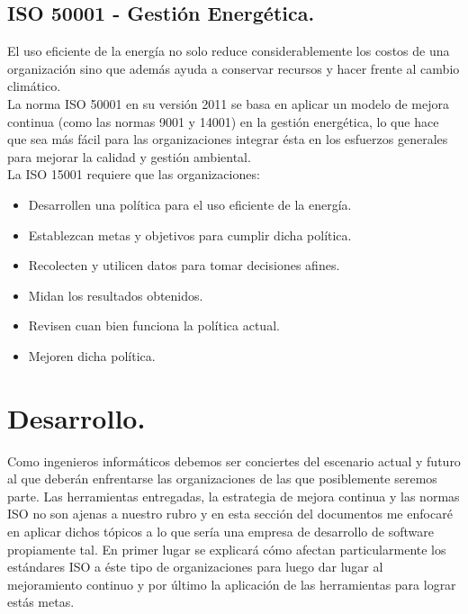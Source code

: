 \documentclass[spanish, fleqn]{article}
\begin{document}
	\subsection{ISO 50001 - Gestión Energética.}
	El uso eficiente de la energía no solo reduce considerablemente los costos
	de una organización sino que además ayuda a conservar recursos y hacer 
	frente al cambio climático.\\
	La norma ISO 50001 en su versión 2011\cite{iso501} se basa en aplicar un 
	modelo de mejora continua (como las normas 9001 y 14001) en la gestión 
	energética, lo que hace que sea más fácil para las organizaciones integrar
	ésta en los esfuerzos generales para mejorar la calidad y gestión ambiental.
	\\ La ISO 15001 requiere que las organizaciones:
	\begin{itemize}
		\item Desarrollen una política para el uso eficiente de la energía.
		\item Establezcan metas y objetivos para cumplir dicha política.
		\item Recolecten y utilicen datos para tomar decisiones afines.
		\item Midan los resultados obtenidos.
		\item Revisen cuan bien funciona la política actual.
		\item Mejoren dicha política.
	\end{itemize}

	\section{Desarrollo.}
	Como ingenieros informáticos debemos ser conciertes del escenario
	actual y futuro al que deberán enfrentarse las organizaciones de las que
	posiblemente seremos parte. Las herramientas entregadas, la estrategia de 
	mejora continua y las normas ISO no son ajenas a nuestro rubro y en esta
	sección del documentos me enfocaré en aplicar dichos tópicos a lo que sería
	una empresa de desarrollo de software propiamente tal. En primer lugar se 
	explicará cómo afectan particularmente los estándares ISO a éste tipo de
	organizaciones para luego dar lugar al mejoramiento continuo y por último 
	la aplicación de las herramientas para lograr estás metas.
\end{document}
